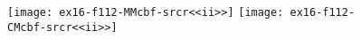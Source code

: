 \documentclass{article}
\begin{document}
\begin{figure}
   \texttt{[image: ex16-f112-MMcbf-srcr<<ii>>]}
   \hfill
   \texttt{[image: ex16-f112-CMcbf-srcr<<ii>>]}
\end{figure}
\end{document}
